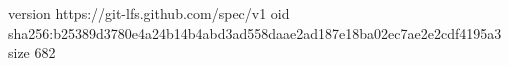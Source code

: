 version https://git-lfs.github.com/spec/v1
oid sha256:b25389d3780e4a24b14b4abd3ad558daae2ad187e18ba02ec7ae2e2cdf4195a3
size 682
